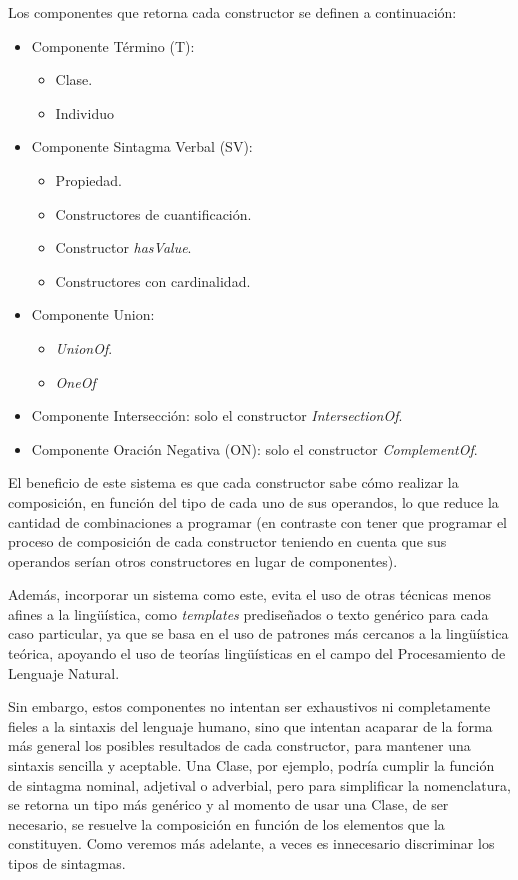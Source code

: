 Los componentes que retorna cada constructor se definen a continuación:
\begin{itemize}
    \item Componente Término (T):
    \begin{itemize}
        \item Clase.
        \item Individuo
    \end{itemize}
    \item Componente Sintagma Verbal (SV):
    \begin{itemize}
        \item Propiedad.
        \item Constructores de cuantificación.
        \item Constructor \emph{hasValue}.
        \item Constructores con cardinalidad.
    \end{itemize}
    \item Componente Union: 
    \begin{itemize}
        \item \emph{UnionOf}.
        \item \emph{OneOf}
    \end{itemize}
    
    \item Componente Intersección: solo el constructor \emph{IntersectionOf}.
    \item Componente Oración Negativa (ON): solo el constructor \emph{ComplementOf}.
\end{itemize}

El beneficio de este sistema es que cada constructor sabe cómo realizar la composición, en función del tipo de cada uno de sus operandos, lo que reduce la cantidad de combinaciones a programar (en contraste con tener que programar el proceso de composición de cada constructor teniendo en cuenta que sus operandos serían otros constructores en lugar de componentes). 

Además, incorporar un sistema como este, evita el uso de otras técnicas menos afines a la lingüística, como \emph{templates} prediseñados o texto genérico para cada caso particular, ya que se basa en el uso de patrones más cercanos a la lingüística teórica, apoyando el uso de teorías lingüísticas en el campo del Procesamiento de Lenguaje Natural.


Sin embargo, estos componentes no intentan ser exhaustivos ni completamente fieles a la sintaxis del lenguaje humano, sino que intentan acaparar de la forma más general los posibles resultados de cada constructor, para mantener una sintaxis sencilla y aceptable. Una Clase, por ejemplo, podría cumplir la función de sintagma nominal, adjetival o adverbial, pero para simplificar la nomenclatura, se retorna un tipo más genérico y al momento de usar una Clase, de ser necesario, se resuelve la composición en función de los elementos que la constituyen. Como veremos más adelante, a veces es innecesario discriminar los tipos de sintagmas.



